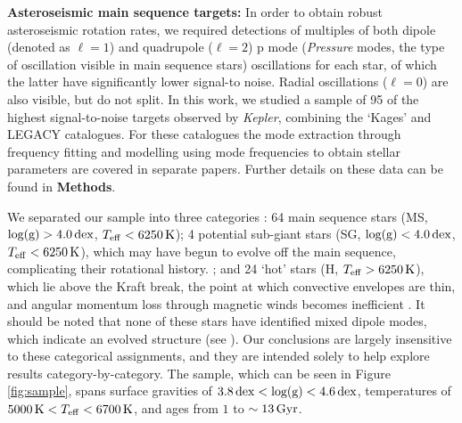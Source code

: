 \documentclass[12pt]{article}
\begin{document}
\textbf{Asteroseismic main sequence targets:} In order to obtain robust asteroseismic rotation rates, we required detections of multiples of both dipole (denoted as $\ell = 1$) and quadrupole ($\ell = 2$) p mode (\textit{Pressure} modes, the type of oscillation visible in main sequence stars) oscillations for each star, of which the latter have significantly lower signal-to noise. Radial oscillations ($\ell = 0$) are also visible, but do not split. In this work, we studied a sample of 95 of the highest signal-to-noise targets observed by \textit{Kepler}, combining the `Kages' \cite{silvaaguirre+2015,davies+2016} and LEGACY \cite{lund+2017, silvaaguirre+2017} catalogues. For these catalogues the mode extraction through frequency fitting \cite{davies+2016, lund+2017} and modelling using mode frequencies to obtain stellar parameters \cite{silvaaguirre+2015, silvaaguirre+2017} are covered in separate papers. Further details on these data can be found in \textbf{Methods}. 

We separated our sample into three categories \cite{garcia+2014}: 64 main sequence stars (MS, $\rm{log(g)} > 4.0\, \rm dex$, $T_{\rm eff} < 6250\, \rm K$); 4 potential sub-giant stars (SG, $\rm{log(g)} < 4.0\, \rm dex$, $T_{\rm eff} < 6250\, \rm K$), which may have begun to evolve off the main sequence, complicating their rotational history. ; and 24 `hot' stars (H, $T_{\rm eff} > 6250\, \rm K$), which lie above the Kraft break, the point at which convective envelopes are thin, and angular momentum loss through magnetic winds becomes inefficient \cite{kraft1967}. It should be noted that none of these stars have identified mixed dipole modes, which indicate an evolved structure (see \cite{bedding+2010}). Our conclusions are largely insensitive to these categorical assignments, and they are intended solely to help explore results category-by-category. The sample, which can be seen in Figure \ref{fig:sample}, spans surface gravities of $3.8\, \rm{dex} < \rm{log(g)} < 4.6\, \rm{dex}$, temperatures of $5000\, \textrm{K} < T_{\rm eff} <  6700\, \rm{K}$, and ages from $1$ to $\sim 13\, \rm{Gyr}$.\\
\end{document}

